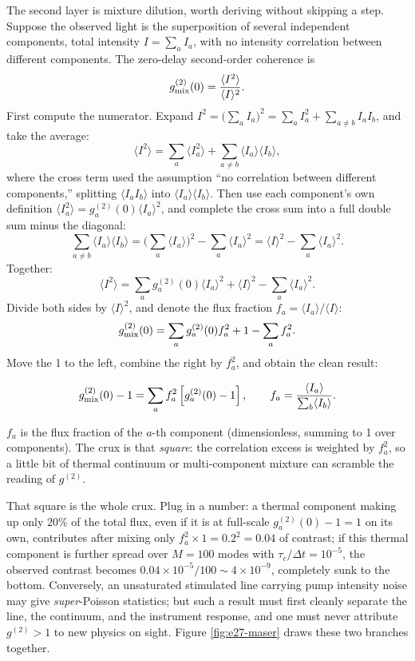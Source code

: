 The second layer is mixture dilution, worth deriving without skipping a step. Suppose the observed light is the superposition of several independent components, total intensity \(I=\sum_a I_a\), with no intensity correlation between different components. The zero-delay second-order coherence is
\[
  g^{(2)}_{\rm mix}(0)=\frac{\langle I^2\rangle}{\langle I\rangle^2}.
\]
First compute the numerator. Expand \(I^2=\big(\sum_a I_a\big)^2=\sum_a I_a^2+\sum_{a\ne b}I_aI_b\), and take the average:
\[
  \langle I^2\rangle
  =\sum_a\langle I_a^2\rangle
  +\sum_{a\ne b}\langle I_a\rangle\langle I_b\rangle,
\]
where the cross term used the assumption ``no correlation between different components,'' splitting \(\langle I_aI_b\rangle\) into \(\langle I_a\rangle\langle I_b\rangle\). Then use each component's own definition \(\langle I_a^2\rangle=g_a^{(2)}(0)\langle I_a\rangle^2\), and complete the cross sum into a full double sum minus the diagonal:
\[
  \sum_{a\ne b}\langle I_a\rangle\langle I_b\rangle
  =\Big(\sum_a\langle I_a\rangle\Big)^2-\sum_a\langle I_a\rangle^2
  =\langle I\rangle^2-\sum_a\langle I_a\rangle^2.
\]
Together:
\[
  \langle I^2\rangle
  =\sum_a g_a^{(2)}(0)\langle I_a\rangle^2
  +\langle I\rangle^2-\sum_a\langle I_a\rangle^2.
\]
Divide both sides by \(\langle I\rangle^2\), and denote the flux fraction \(f_a=\langle I_a\rangle/\langle I\rangle\):
\[
  g^{(2)}_{\rm mix}(0)
  =\sum_a g_a^{(2)}(0)f_a^2+1-\sum_a f_a^2.
\]
Move the 1 to the left, combine the right by \(f_a^2\), and obtain the clean result:

\begin{equation}
  g^{(2)}_{\rm mix}(0)-1
  =\sum_a f_a^2\left[g_a^{(2)}(0)-1\right],
  \qquad
  f_a=\frac{\langle I_a\rangle}{\sum_b\langle I_b\rangle}.
  \label{eq:e27-mixture}
\end{equation}
\begin{formulaexplain}
\(f_a\) is the flux fraction of the \(a\)-th component (dimensionless, summing to 1 over components). The crux is that \emph{square}: the correlation excess is weighted by \(f_a^2\), so a little bit of thermal continuum or multi-component mixture can scramble the reading of \(g^{(2)}\).
\end{formulaexplain}

That square is the whole crux. Plug in a number: a thermal component making up only \(20\%\) of the total flux, even if it is at full-scale \(g_a^{(2)}(0)-1=1\) on its own, contributes after mixing only \(f_a^2\times1=0.2^2=0.04\) of contrast; if this thermal component is further spread over \(M=100\) modes with \(\tau_c/\Delta t=10^{-5}\), the observed contrast becomes \(0.04\times10^{-5}/100\sim4\times10^{-9}\), completely sunk to the bottom. Conversely, an unsaturated stimulated line carrying pump intensity noise may give \emph{super}-Poisson statistics; but such a result must first cleanly separate the line, the continuum, and the instrument response, and one must never attribute \(g^{(2)}>1\) to new physics on sight. Figure \ref{fig:e27-maser} draws these two branches together.

